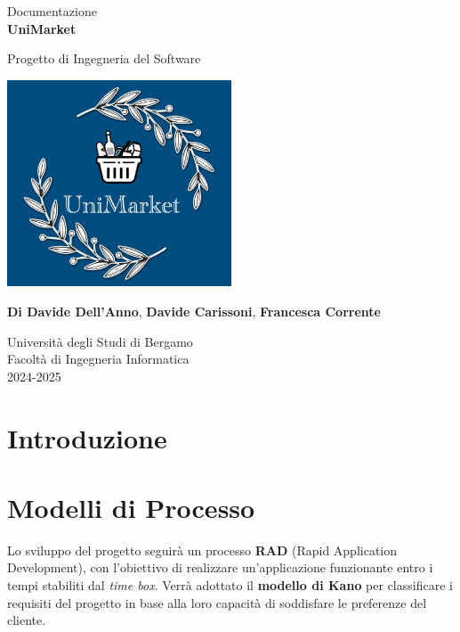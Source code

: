 \documentclass[a4paper,12pt]{article}
\begin{document}
\begin{titlepage}
    \centering
    \vspace*{2cm}
    
    \vspace{1.5cm}
    
    \large Documentazione\\
    \Huge
    \textbf{UniMarket}
    
    \vspace{1.5cm}
    
    \LARGE
    Progetto di Ingegneria del Software
    
    \vspace{1.5cm}
    \includegraphics[width=0.5\textwidth]{../Media/logo.jpeg}
    
    \vspace{1.5cm}
    \small
    \textbf{Di Davide Dell'Anno}, \textbf{Davide Carissoni}, \textbf{Francesca Corrente}
    
    \vspace{1.5cm}
    
    \Large
    Università degli Studi di Bergamo \\
    Facoltà di Ingegneria Informatica \\
    2024-2025
    
\end{titlepage}

\renewcommand{\contentsname}{Indice}
\tableofcontents
\newpage


\section{Introduzione} %

\section{Modelli di Processo} %
Lo sviluppo del progetto seguirà un processo \textbf{RAD} (Rapid Application Development), con l’obiettivo di realizzare un’applicazione funzionante entro i tempi stabiliti dal \textit{time box}.  
Verrà adottato il \textbf{modello di Kano} per classificare i requisiti del progetto in base alla loro capacità di soddisfare le preferenze del cliente.
\end{document}
